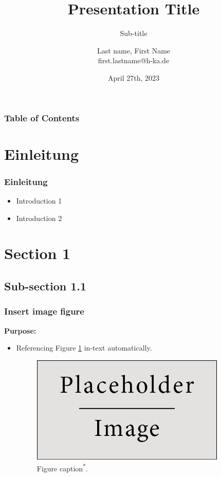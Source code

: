 \documentclass[t, aspectratio=169]{beamer}
\title[Short Title] %
{Presentation Title}
\subtitle{Sub-title}
\author[Last Name, First name] %
{Last name, First Name \\
first.lastname@h-ka.de}
\date[April 27th, 2023] %
{April 27th, 2023}
\begin{document}
\frame{\titlepage}


\begin{frame}
\frametitle{Table of Contents}
\tableofcontents
\end{frame}


\section{Einleitung}
\begin{frame}
\frametitle{Einleitung}

\begin{itemize}
    \item Introduction 1
    \item Introduction 2
\end{itemize}

\end{frame}

\section{Section 1}
\subsection{Sub-section 1.1}

\begin{frame}
\frametitle{Insert image figure}
\textbf{Purpose:} 
\begin{itemize}
    \item Referencing Figure \ref{fig:placeholder} in-text automatically.

\begin{figure}[h]
    \centering
    \includegraphics[scale=0.5]{Pictures/placeholder.jpg}
    \caption{Figure caption\textsuperscript{*}.}
    \label{fig:placeholder}
\end{figure}


\end{itemize}
\end{frame}
\end{document}
